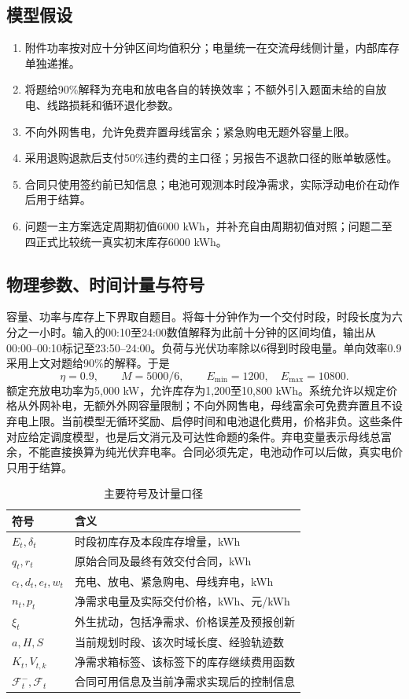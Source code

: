 \documentclass[UTF8,a4paper,zihao=-4,fontset=mac]{ctexart}
\begin{document}
\subsection{模型假设}
\begin{enumerate}
\item 附件功率按对应十分钟区间均值积分；电量统一在交流母线侧计量，内部库存单独递推。
\item 将题给90\%解释为充电和放电各自的转换效率；不额外引入题面未给的自放电、线路损耗和循环退化参数。
\item 不向外网售电，允许免费弃置母线富余；紧急购电无题外容量上限。
\item 采用退购退款后支付50\%违约费的主口径；另报告不退款口径的账单敏感性。
\item 合同只使用签约前已知信息；电池可观测本时段净需求，实际浮动电价在动作后用于结算。
\item 问题一主方案选定周期初值6000 kWh，并补充自由周期初值对照；问题二至四正式比较统一真实初末库存6000 kWh。
\end{enumerate}
\subsection{物理参数、时间计量与符号}
容量、功率与库存上下界取自题目。将每十分钟作为一个交付时段，时段长度为六分之一小时。输入的00:10至24:00数值解释为此前十分钟的区间均值，输出从00:00--00:10标记至23:50--24:00。负荷与光伏功率除以6得到时段电量。单向效率0.9采用上文对题给90\%的解释。于是
\begin{equation}
 \eta=0.9,\qquad M=5000/6,\qquad E_{\min}=1200,\quad E_{\max}=10800.
\end{equation}
额定充放电功率为5,000 kW，允许库存为1,200至10,800 kWh。系统允许以规定价格从外网补电，无额外外网容量限制；不向外网售电，母线富余可免费弃置且不设弃电上限。当前模型无循环奖励、启停时间和电池退化费用，价格非负。这些条件对应给定调度模型，也是后文消元及可达性命题的条件。弃电变量表示母线总富余，不能直接换算为纯光伏弃电率。合同必须先定，电池动作可以后做，真实电价只用于结算。

\begin{table}[htbp]\centering\small
\caption{主要符号及计量口径}
\begin{tabular}{lp{10.2cm}}\toprule
符号 & 含义 \\ \midrule
$E_t,\delta_t$ & 时段初库存及本段库存增量，kWh \\
$q_t,r_t$ & 原始合同及最终有效交付合同，kWh \\
$c_t,d_t,e_t,w_t$ & 充电、放电、紧急购电、母线弃电，kWh \\
$n_t,p_t$ & 净需求电量及实际交付价格，kWh、元/kWh \\
$\xi_t$ & 外生扰动，包括净需求、价格误差及预报创新 \\
$a,H,S$ & 当前规划时段、该次时域长度、经验轨迹数 \\
$K_t,V_{t,k}$ & 净需求箱标签、该标签下的库存继续费用函数 \\
$\mathcal F_t^-,\mathcal F_t$ & 合同可用信息及当前净需求实现后的控制信息 \\
\bottomrule\end{tabular}\end{table}
\end{document}
